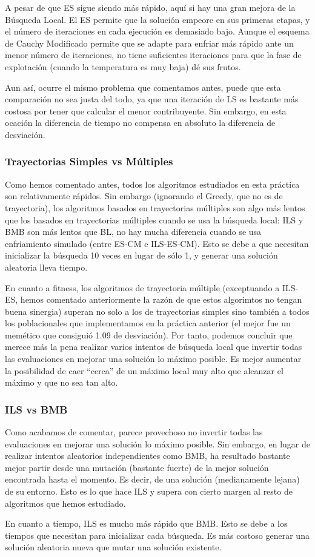 \documentclass{article}
\begin{document}
A pesar de que ES sigue siendo más rápido, aquí si hay una gran mejora de la Búsqueda Local. El ES permite que la solución empeore en sus primeras etapas, y el
número de iteraciones en cada ejecución es demasiado bajo. Aunque el esquema de Cauchy Modificado permite que se adapte para
enfriar más rápido ante un menor número de iteraciones, no tiene suficientes iteraciones para que la fase de explotación
(cuando la temperatura es muy baja) dé sus frutos.

Aun así, ocurre el mismo problema que comentamos antes, puede que esta
comparación no sea justa del todo, ya que una iteración de LS es bastante más costosa por tener que calcular el menor contribuyente. Sin embargo, en esta ocación la diferencia de tiempo no compensa en absoluto la diferencia de desviación.

\subsubsection*{Trayectorias Simples vs Múltiples}

Como hemos comentado antes, todos los algoritmos estudiados en esta práctica son relativamente rápidos. Sin embargo
(ignorando el Greedy, que no es de trayectoria), los algoritmos basados en trayectorias múltiples son algo más lentos
que los basados en trayectorias múltiples cuando se usa la búsqueda local: ILS y BMB son más lentos que BL, no hay mucha
diferencia cuando se usa enfriamiento simulado (entre ES-CM e ILS-ES-CM). Esto
se debe a que necesitan inicializar la búsqueda 10 veces en lugar de sólo 1, y generar una solución aleatoria lleva tiempo.

En cuanto a fitness, los algoritmos de trayectoria múltiple (exceptuando a ILS-ES, hemos comentado anteriormente la razón
de que estos algorimtos no tengan buena sinergia) superan no solo a los de trayectorias simples sino también a todos los poblacionales que implementamos en la práctica anterior (el mejor fue un memético que consiguió 1.09 de desviación).
Por tanto, podemos concluir que merece más la pena realizar varios intentos de búsqueda local que invertir todas las
evaluaciones en mejorar una solución lo máximo posible. Es mejor aumentar la posibilidad de caer ``cerca'' de un máximo local
muy alto que alcanzar el máximo y que no sea tan alto.

\subsubsection*{ILS vs BMB}

Como acabamos de comentar, parece provechoso no invertir todas las evaluaciones en mejorar una solución lo máximo posible.
Sin embargo, en lugar de realizar intentos aleatorios independientes como BMB, ha resultado bastante mejor partir desde
una mutación (bastante fuerte) de la mejor solución encontrada hasta el momento. Es decir, de una solución (medianamente
lejana) de su entorno. Esto es lo que hace ILS y supera con cierto margen al resto de algoritmos que hemos estudiado.

En cuanto a tiempo, ILS es mucho más rápido que BMB. Esto se debe a los tiempos que necesitan para inicializar cada
búsqueda. Es más costoso generar una solución aleatoria nueva que mutar una solución existente.
\end{document}

